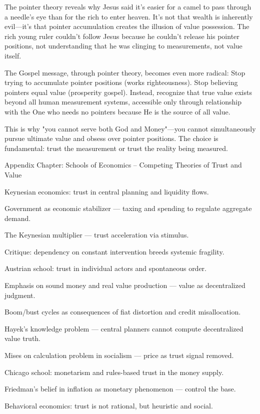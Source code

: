 \documentclass[11pt,oneside]{book}
\begin{document}
{{{{{{The pointer theory reveals why Jesus said it's easier for a camel to pass through a needle's eye than for the rich to enter heaven. It's not that wealth is inherently evil—it's that pointer accumulation creates the illusion of value possession. The rich young ruler couldn't follow Jesus because he couldn't release his pointer positions, not understanding that he was clinging to measurements, not value itself.

The Gospel message, through pointer theory, becomes even more radical: Stop trying to accumulate pointer positions (works righteousness). Stop believing pointers equal value (prosperity gospel). Instead, recognize that true value exists beyond all human measurement systems, accessible only through relationship with the One who needs no pointers because He is the source of all value.

This is why "you cannot serve both God and Money"—you cannot simultaneously pursue ultimate value and obsess over pointer positions. The choice is fundamental: trust the measurement or trust the reality being measured.

Appendix Chapter: Schools of Economics – Competing Theories of Trust and Value

Keynesian economics: trust in central planning and liquidity flows.

Government as economic stabilizer — taxing and spending to regulate aggregate demand.

The Keynesian multiplier — trust acceleration via stimulus.

Critique: dependency on constant intervention breeds systemic fragility.

Austrian school: trust in individual actors and spontaneous order.

Emphasis on sound money and real value production — value as decentralized judgment.

Boom/bust cycles as consequences of fiat distortion and credit misallocation.

Hayek’s knowledge problem — central planners cannot compute decentralized value truth.

Mises on calculation problem in socialism — price as trust signal removed.

Chicago school: monetarism and rules-based trust in the money supply.

Friedman’s belief in inflation as monetary phenomenon — control the base.

Behavioral economics: trust is not rational, but heuristic and social.

}}}}}}
\end{document}
